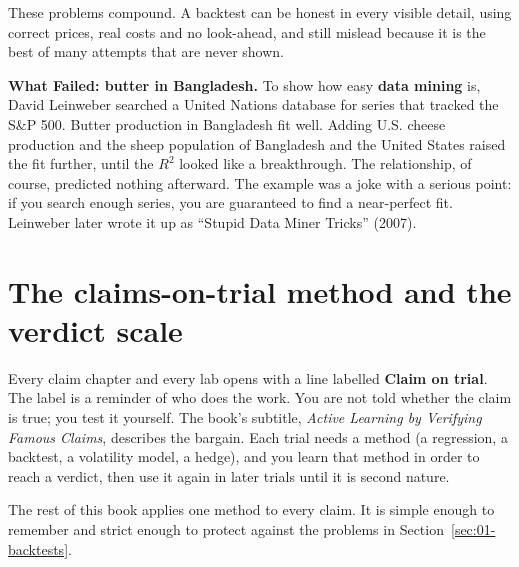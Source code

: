 These problems compound. A backtest can be honest in every visible detail, using correct prices, real costs and no look-ahead, and still mislead because it is the best of many attempts that are never shown.

\begin{callout}
\textbf{What Failed: butter in Bangladesh.} To show how easy \textbf{data mining} is, David Leinweber searched a United Nations database for series that tracked the S\&P 500. Butter production in Bangladesh fit well. Adding U.S. cheese production and the sheep population of Bangladesh and the United States raised the fit further, until the $R^2$ looked like a breakthrough. The relationship, of course, predicted nothing afterward. The example was a joke with a serious point: if you search enough series, you are guaranteed to find a near-perfect fit. Leinweber later wrote it up as ``Stupid Data Miner Tricks'' (2007).
\end{callout}

\section{The claims-on-trial method and the verdict scale}
\label{sec:01-method}

Every claim chapter and every lab opens with a line labelled \textbf{Claim on trial}. The label is a reminder of who does the work. You are not told whether the claim is true; you test it yourself. The book's subtitle, \emph{Active Learning by Verifying Famous Claims}, describes the bargain. Each trial needs a method (a regression, a backtest, a volatility model, a hedge), and you learn that method in order to reach a verdict, then use it again in later trials until it is second nature.

The rest of this book applies one method to every claim. It is simple enough to remember and strict enough to protect against the problems in Section~\ref{sec:01-backtests}.

